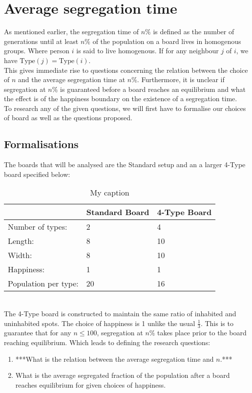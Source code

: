 \documentclass{article}
\begin{document}
\section{Average segregation time}
	As mentioned earlier, the segregation time of \(n\%\) is defined as the number of generations until at least \(n\%\) of the population on a board lives in homogenous groups. 
Where person \(i\) is said to live homogenous. If for any neighbour \(j\) of \(i\), we have \(\text{Type}(j)=\text{Type}(i)\).\\
This gives immediate rise to questions concerning the relation between the choice of \(n\) and the average segregation time at \(n\%\). 
Furthermore, it is unclear if segregation at \(n\%\) is guaranteed before a board reaches an equilibrium and what the effect is of the happiness boundary on the existence of a segregation time.\\

To research any of the given questions, we will first have to formalise our choices of board as well as the questions proposed.

\subsection{Formalisations}
The boards that will be analysed are the Standard setup and an a larger 4-Type board specified below:
\begin{table}[h!]
\centering
\caption{My caption}
\label{my-label}
\begin{tabular}{l|l|l}
  & Standard Board & 4-Type Board\\ \hline
Number of types:& 2 & 4 \\ 
 Length:& 8 & 10  \\
 Width:& 8 & 10  \\
 Happiness:& 1 & 1  \\
Population per type: & 20 & 16  
	\end{tabular}
	\end{table}
\\
The 4-Type board is constructed to maintain the same ratio of inhabited and uninhabited spots. The choice of happiness is 1 unlike the usual \(\frac{1}{3}\). 
This is to guarantee that for any \(n\leq 100\), segregation at \(n\%\) takes place prior to the board reaching equilibrium. Which leads to defining the research questions:

\begin{enumerate}
 \item ***What is the relation between the average segregation time and \(n\).***
 \item What is the average segregated fraction of the population after a board reaches equilibrium for given choices of happiness.
\end{enumerate}
\end{document}
